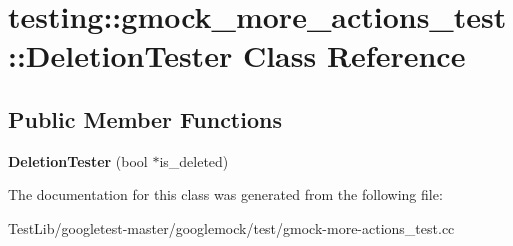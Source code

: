 \hypertarget{classtesting_1_1gmock__more__actions__test_1_1DeletionTester}{}\section{testing\+:\+:gmock\+\_\+more\+\_\+actions\+\_\+test\+:\+:Deletion\+Tester Class Reference}
\label{classtesting_1_1gmock__more__actions__test_1_1DeletionTester}
\subsection*{Public Member Functions}
\begin{DoxyCompactItemize}
\item 
\mbox{\label{classtesting_1_1gmock__more__actions__test_1_1DeletionTester_a3b9670fc6d29cb9d120fb0fdd2ba68d8}} 
{\bfseries Deletion\+Tester} (bool $\ast$is\+\_\+deleted)
\end{DoxyCompactItemize}


The documentation for this class was generated from the following file\+:\begin{DoxyCompactItemize}
\item 
Test\+Lib/googletest-\/master/googlemock/test/gmock-\/more-\/actions\+\_\+test.\+cc\end{DoxyCompactItemize}
